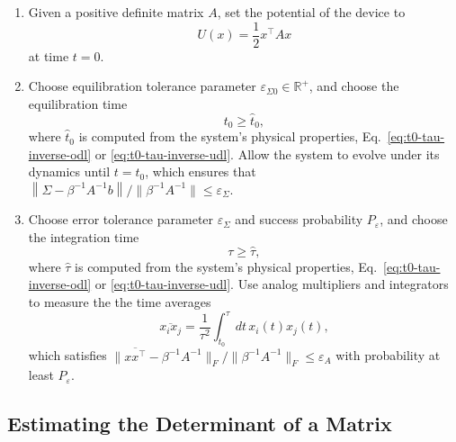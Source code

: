 \documentclass[prx,onecolumn,floatfix,longbibliography,notitlepage, nofootinbib]{revtex4-1}
\renewcommand{\geq}{\geqslant}
\renewcommand{\leq}{\leqslant}
\begin{document}
\begin{tcolorbox}[title={Inverse Estimation Protocol},breakable]
\begin{enumerate}
\item Given a positive definite matrix $A$, set the potential of the device to
\begin{equation}
    U(x) = \frac{1}{2} x^\intercal A x
\end{equation}
at time $t=0$.
\item Choose equilibration tolerance parameter $\varepsilon_{\Sigma 0} \in \mathbb{R}^+$, and choose the equilibration time
\begin{equation}
\label{eq:UDL-eq-time}
t_0 \geq \widehat{t}_0,
\end{equation}
where $\widehat{t}_0$ is computed from the system's physical properties, Eq.~\eqref{eq:t0-tau-inverse-odl} or \eqref{eq:t0-tau-inverse-udl}. Allow the system to evolve under its dynamics until $t=t_0$, which ensures that $\left\|\Sigma - \beta^{-1} A^{-1} b\right\|/\|\beta^{-1}A^{-1}\| \leq \varepsilon_\Sigma$.
\item  Choose error tolerance parameter $\varepsilon_\Sigma$ and success probability $P_\varepsilon$, and choose the integration time
\begin{equation}
    \tau \geq \widehat{\tau},
\end{equation}
where $\widehat{\tau}$ is computed from the system's physical properties, Eq.~\eqref{eq:t0-tau-inverse-odl} or \eqref{eq:t0-tau-inverse-udl}. Use analog multipliers and integrators to measure the the time averages
\begin{equation}
    \overline{x_i x_j} = \frac{1}{\tau^2} \int_{t_0}^\tau dt\, x_i(t) x_j(t),
\end{equation}
which satisfies $\|\overline{x x^\intercal} - \beta^{-1}A^{-1}\|_F/\|\beta^{-1}A^{-1}\|_F \leq \varepsilon_A$ with probability at least $P_\varepsilon$.
\end{enumerate}
\end{tcolorbox}
\medskip









\subsection{Estimating the Determinant of a Matrix}
\end{document}
